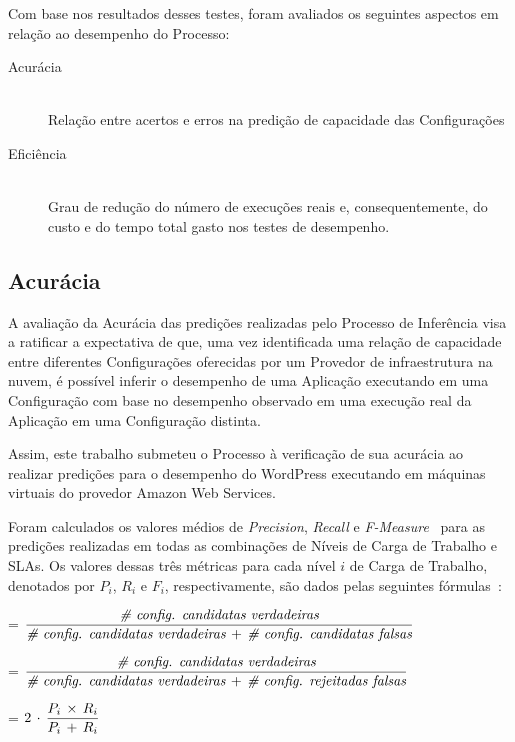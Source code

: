 Com base nos resultados desses testes, foram avaliados os seguintes aspectos em
relação ao desempenho do Processo: 

\begin{description}
  \item[Acurácia] \hfill \\ Relação entre acertos e erros na predição de 
  capacidade das Configurações    
  \item[Eficiência] \hfill \\ Grau de redução do número de execuções reais e,
  consequentemente, do custo e do tempo total gasto nos testes de desempenho.
\end{description}

\subsection{Acurácia}
\label{subsec:resultados_precisao}
A avaliação da Acurácia das predições realizadas pelo Processo de Inferência visa 
a ratificar a expectativa de que, uma vez identificada uma relação de capacidade 
entre diferentes Configurações oferecidas por um Provedor de infraestrutura na 
nuvem, é possível inferir o desempenho de uma Aplicação executando em uma 
Configuração com base no desempenho observado em uma execução real da Aplicação 
em uma Configuração distinta.

Assim, este trabalho submeteu o Processo à verificação de sua acurácia ao realizar
predições para o desempenho do WordPress executando em máquinas virtuais do provedor
Amazon Web Services. 


\unboldmath

Foram calculados os valores médios de \emph{Precision}, \emph{Recall} e \emph{F-Measure}~\cite{powers2011evaluation} 
para as predições realizadas em todas as combinações de Níveis de Carga de 
Trabalho e SLAs. Os valores dessas três métricas para cada nível \emph{$i$} de Carga de Trabalho, denotados por $P_{i}$, $R_{i}$ e $F_{i}$, respectivamente, são dados pelas seguintes fórmulas~\cite{powers2011evaluation}:

\begin{description}[leftmargin=!]
  \item[$P_{i}$] = $\dfrac{\emph{\# config. candidatas verdadeiras}}{\emph{\# config. candidatas verdadeiras}\,+\,\emph{\# config. candidatas falsas}}$
  \item[$R_{i}$] = $\dfrac{\emph{\# config. candidatas verdadeiras}}{\emph{\# config. candidatas verdadeiras}\,+\,\emph{\# config. rejeitadas falsas}}$
  \item[$F_{i}$] = $2\,\cdot\,\dfrac{\emph{$P_{i}$}\,\times\,\emph{$R_{i}$}}{\emph{$P_{i}$}\,+\,\emph{$R_{i}$}}$
\end{description}


